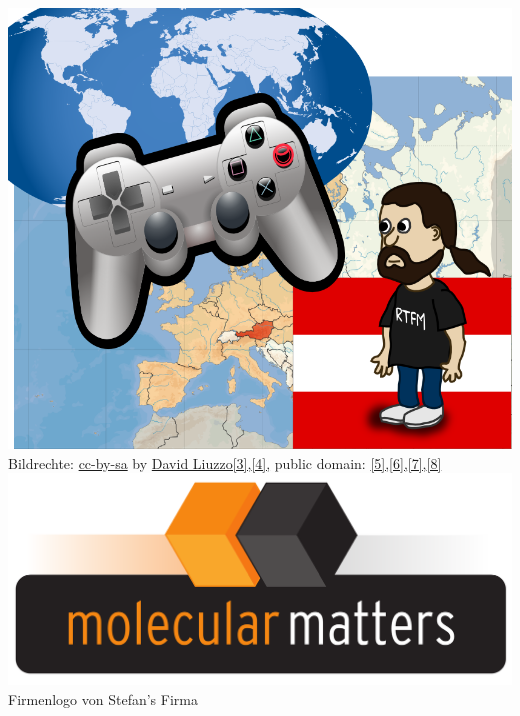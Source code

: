 \begin{center}
\includegraphics[width=\linewidth]{austrianguy/austrianguy.png} \\
\footnotesize{Bildrechte: \href{https://creativecommons.org/licenses/by-sa/4.0/deed.en}{cc-by-sa} by \href{https://commons.wikimedia.org/wiki/User:David_Liuzzo}{David Liuzzo[3],}\href{https://commons.wikimedia.org/wiki/File:EU_location_AUT.png}{[4],} public domain: \href{http://openclipart.org/detail/175351/playstation-controller-by-matthewhenninger-175351}{[5],}\href{http://openclipart.org/detail/21847/comic-characters:-bearded-guy-by-nicubunu}{[6],}\href{http://openclipart.org/detail/7885/blue-world-map-by-neocreo}{[7],}\href{http://openclipart.org/detail/12612/flag-of-austria-by-anonymous}{[8]}} \\
\includegraphics[width=0.8\linewidth]{austrianguy/molecularmatters.png} \\
\footnotesize{Firmenlogo von Stefan's Firma}
\end{center}

